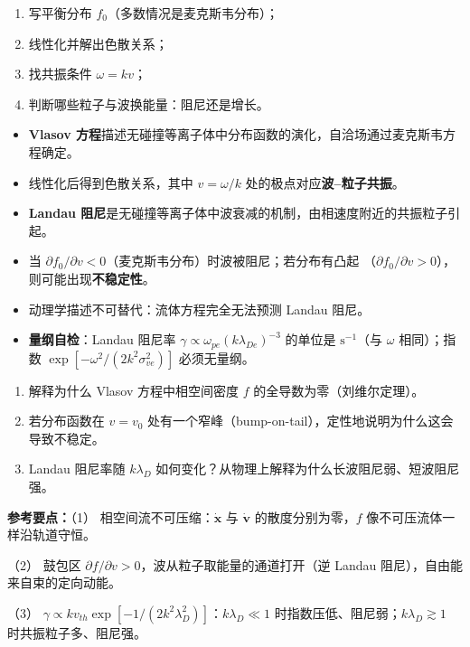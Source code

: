 \documentclass[12pt,a4paper,openany,oneside]{book}
\newcommand{\quizans}[1]{\par\medskip{\color{figGray}\rule{\linewidth}{0.3pt}}\par\smallskip
  {\footnotesize\textbf{参考要点：}#1}}
\newcommand{\vect}[1]{\bm{#1}}
\begin{document}
\begin{strategy}
\small
\begin{enumerate}[leftmargin=1.4em,itemsep=1pt,topsep=2pt]
\item 写平衡分布 $f_0$（多数情况是麦克斯韦分布）；
\item 线性化并解出色散关系；
\item 找共振条件 $\omega=k v$；
\item 判断哪些粒子与波换能量：阻尼还是增长。
\end{enumerate}
\end{strategy}

\begin{chapterreview}
\begin{itemize}
\item \textbf{Vlasov 方程}描述无碰撞等离子体中分布函数的演化，自洽场通过麦克斯韦方程确定。
\item 线性化后得到色散关系，其中 $v = \omega/k$ 处的极点对应\textbf{波--粒子共振}。
\item \textbf{Landau 阻尼}是无碰撞等离子体中波衰减的机制，由相速度附近的共振粒子引起。
\item 当 $\partial f_0/\partial v < 0$（麦克斯韦分布）时波被阻尼；若分布有凸起 （$\partial f_0/\partial v > 0$），则可能出现\textbf{不稳定性}。
\item 动理学描述不可替代：流体方程完全无法预测 Landau 阻尼。
\item \textbf{量纲自检}：Landau 阻尼率 $\gamma\propto\omega_{pe}(k\lambda_{De})^{-3}$ 的单位是 $\mathrm{s^{-1}}$（与 $\omega$ 相同）；指数 $\exp[-\omega^2/(2k^2\sigma_{ve}^2)]$ 必须无量纲。
\end{itemize}
\end{chapterreview}

\begin{miniquiz}
\begin{enumerate}
\item 解释为什么 Vlasov 方程中相空间密度 $f$ 的全导数为零（刘维尔定理）。
\item 若分布函数在 $v=v_0$ 处有一个窄峰（bump-on-tail），定性地说明为什么这会导致不稳定。
\item Landau 阻尼率随 $k\lambda_D$ 如何变化？从物理上解释为什么长波阻尼弱、短波阻尼强。
\end{enumerate}
\quizans{（1） 相空间流不可压缩：$\dot{\vect x}$ 与 $\dot{\vect v}$ 的散度分别为零，$f$ 像不可压流体一样沿轨道守恒。\par （2） 鼓包区 $\partial f/\partial v>0$，波从粒子取能量的通道打开（逆 Landau 阻尼），自由能来自束的定向动能。\par （3） $\gamma\propto kv_{th}\exp[-1/(2k^2\lambda_D^2)]$：$k\lambda_D\ll1$ 时指数压低、阻尼弱；$k\lambda_D\gtrsim1$ 时共振粒子多、阻尼强。}
\end{miniquiz}
\end{document}
